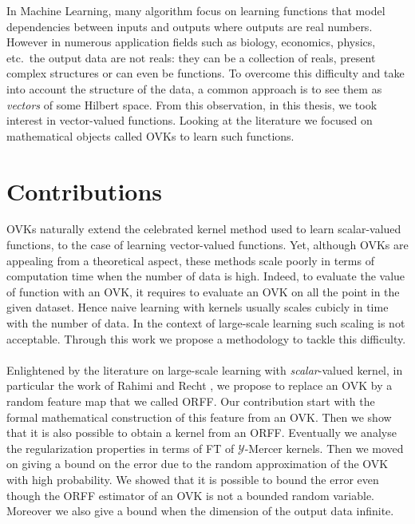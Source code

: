 In Machine Learning, many algorithm focus on learning functions that model
dependencies between inputs and outputs where outputs are real numbers. However
in numerous application fields such as biology, economics, physics, etc.~the
output data are not reals: they can be a collection of reals, present
complex structures or can even be functions. To overcome this difficulty
and take into account the structure of the data, a common approach is to
see them as \emph{vectors} of some Hilbert space. From this observation, in
this thesis, we took interest in vector-valued functions. Looking at the
literature we focused on mathematical objects called \aclp{OVK} to learn
such functions.

\section{Contributions}
\acsp{OVK} naturally extend the celebrated kernel method used to learn
scalar-valued functions, to the case of learning vector-valued functions.
Yet, although \acsp{OVK} are appealing from a theoretical aspect, these
methods scale poorly in terms of computation time when the number of data
is high. Indeed, to evaluate the value of function with an \acl{OVK}, it
requires to evaluate an \acl{OVK} on all the point in the given dataset.
Hence naive learning with kernels usually scales cubicly in time with the
number of data. In the context of large-scale learning such scaling is not
acceptable. Through this work we propose a methodology to tackle this
difficulty.
\paragraph{}
Enlightened by the literature on large-scale learning with
\emph{scalar}-valued kernel, in particular the work of Rahimi and Recht
\citep{Rahimi2007}, we propose to replace an \acs{OVK} by a random feature
map that we called \acl{ORFF}. Our contribution start with the formal
mathematical construction of this feature from an \acs{OVK}. Then we show
that it is also possible to obtain a kernel from an \acs{ORFF}. Eventually
we analyse the regularization properties in terms of \acl{FT} of
$\mathcal{Y}$-Mercer kernels. Then we moved on giving a bound on the error
due to the random approximation of the \acs{OVK} with high probability.
We showed that it is possible to bound the error even though the \acs{ORFF}
estimator of an \acs{OVK} is not a bounded random variable. Moreover we
also give a bound when the dimension of the output data infinite.
